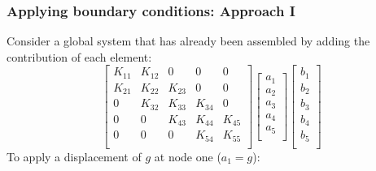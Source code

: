 \documentclass[handout]{beamer}
\begin{document}


\begin{frame}
\frametitle{Applying boundary conditions: Approach I}
Consider a global system that has already been assembled by adding the contribution of
each element:
\begin{equation*}
	\begin{bmatrix}
		K_{11} & K_{12} & 0 & 0 & 0 \\
		K_{21} & K_{22} & K_{23} & 0 & 0 \\
		0 & K_{32} & K_{33} & K_{34} & 0 \\
		0 & 0 & K_{43} & K_{44} & K_{45} \\
		0 & 0 & 0  &  K_{54} & K_{55}\\
	\end{bmatrix} %
	\begin{bmatrix}
		a_1 \\
		a_2 \\
		a_3 \\
		a_4 \\
		a_5 \\
	\end{bmatrix}  %
	\begin{bmatrix}
		b_1 \\
		b_2 \\
		b_3 \\
		b_4 \\
		b_5 \\
	\end{bmatrix}
\end{equation*}
To apply a displacement of $g$ at node one ($a_1 = g$):


\end{frame}
\end{document}
